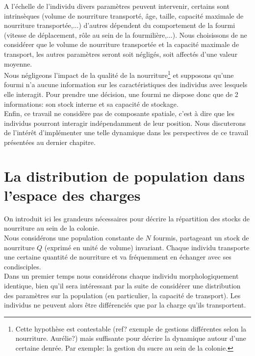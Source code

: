 A l'échelle de l'individu divers paramètres peuvent intervenir, certains sont intrinsèques (volume de nourriture transporté, âge, taille, capacité maximale de nourriture transportée,...) d'autres dépendent du comportement de la fourmi (vitesse de déplacement, rôle au sein de la fourmilière,...). Nous choisissons de ne considérer que le volume de nourriture transportée et la capacité maximale de transport, les autres paramètres seront soit négligés, soit affectés d'une valeur moyenne.\\

Nous négligeons l'impact de la qualité de la nourriture\footnote{Cette hypothèse est contestable (ref? exemple de gestions différentes selon la nourriture. Aurélie?) mais suffisante pour décrire la dynamique autour d'une certaine denrée. Par exemple: la gestion du sucre au sein de la colonie.} et supposons qu'une fourmi n'a aucune information sur les caractéristiques des individus avec lesquels elle interagit. Pour prendre une décision, une fourmi ne dispose donc que de 2 informations: son stock interne et sa capacité de stockage.\\

Enfin, ce travail ne considère pas de composante spatiale, c'est à dire que les individus pourront interagir indépendamment de leur position. Nous discuterons de l'intérêt d'implémenter une telle dynamique dans les perspectives de ce travail présentées au dernier chapitre.


\section{La distribution de population dans l'espace des charges}

On introduit ici les grandeurs nécessaires pour décrire la répartition des stocks de nourriture au sein de la colonie.\\

Nous considérons une population constante de $N$ fourmis, partageant un stock de nourriture $Q$ (exprimé en unité de volume) invariant. Chaque individu transporte une certaine quantité de nourriture  et va fréquemment en échanger avec ses condisciples. \\

Dans un premier temps nous considérons chaque individu morphologiquement identique, bien qu'il sera intéressant par la suite de considérer une distribution des paramètres sur la population (en particulier, la capacité de transport). Les individus ne peuvent alors être différenciés que par la charge qu'ils transportent.\\

